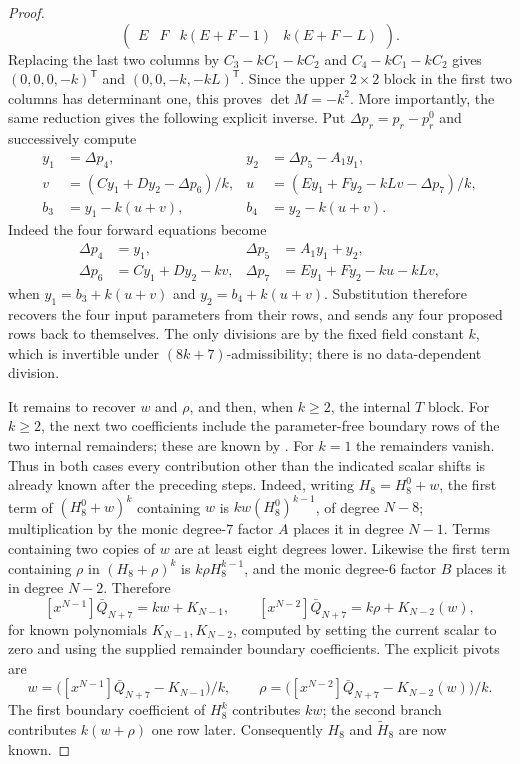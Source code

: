 \begin{proof}
\[\begin{pmatrix}
        E&F&k(E+F-1)&k(E+F-L)
      \end{pmatrix}.
    \]
    Replacing the last two columns by
    $C_3-kC_1-kC_2$ and $C_4-kC_1-kC_2$ gives
    $(0,0,0,-k)^{\mathsf T}$ and $(0,0,-k,-kL)^{\mathsf T}$.
    Since the upper $2\times2$ block in the first two columns has determinant
    one, this proves $\det M=-k^2$.  More importantly, the same reduction
    gives the following explicit inverse.  Put $\Delta p_r=p_r-p^0_r$ and
    successively compute
    \[
      \begin{aligned}
        y_1&=\Delta p_4,&
        y_2&=\Delta p_5-A_1y_1,\\
        v&=(Cy_1+Dy_2-\Delta p_6)/k,&
        u&=(Ey_1+Fy_2-kLv-\Delta p_7)/k,\\
        b_3&=y_1-k(u+v),&
        b_4&=y_2-k(u+v).
      \end{aligned}
    \]
    Indeed the four forward equations become
    \[
      \begin{aligned}
        \Delta p_4&=y_1,&
        \Delta p_5&=A_1y_1+y_2,\\
        \Delta p_6&=Cy_1+Dy_2-kv,&
        \Delta p_7&=Ey_1+Fy_2-ku-kLv,
      \end{aligned}
    \]
    when $y_1=b_3+k(u+v)$ and $y_2=b_4+k(u+v)$.
    Substitution therefore recovers the four input parameters from their
    rows, and sends any four proposed rows back to themselves.  The only
    divisions are by the fixed field constant $k$, which is
    invertible under $(8k+7)$-admissibility; there is no data-dependent
    division.

    It remains to recover $w$ and $\rho$, and then, when $k\ge2$, the
    internal $T$ block.  For $k\ge2$, the next two coefficients include the
    parameter-free boundary rows of the two internal remainders; these are
    known by .  For $k=1$
    the remainders vanish.  Thus in both cases every contribution other than
    the indicated scalar shifts is already known after the preceding steps.
    Indeed, writing
    $H_8=H_8^0+w$, the first term of $(H_8^0+w)^k$ containing $w$ is
    $kw(H_8^0)^{k-1}$, of degree $N-8$; multiplication by the monic
    degree-$7$ factor $A$ places it in degree $N-1$.  Terms containing two
    copies of $w$ are at least eight degrees lower.  Likewise the first term
    containing $\rho$ in $(H_8+\rho)^k$ is
    $k\rho H_8^{k-1}$, and the monic degree-$6$ factor $B$ places it in
    degree $N-2$.  Therefore
    \[
      [x^{N-1}]\bar Q_{N+7}=kw+K_{N-1},\qquad
      [x^{N-2}]\bar Q_{N+7}=k\rho+K_{N-2}(w),
    \]
    for known polynomials $K_{N-1},K_{N-2}$, computed by setting the current
    scalar to zero and using the supplied remainder boundary coefficients.
    The explicit pivots are
    \[
      w=\bigl([x^{N-1}]\bar Q_{N+7}-K_{N-1}\bigr)/k,
      \qquad
      \rho=\bigl([x^{N-2}]\bar Q_{N+7}-K_{N-2}(w)\bigr)/k.
    \]
    The first boundary coefficient of $H_8^k$ contributes $kw$; the
    second branch contributes $k(w+\rho)$ one row later.
    Consequently $H_8$ and $\widetilde H_8$ are now known.


\end{proof}
